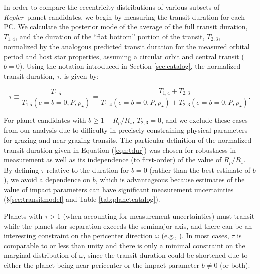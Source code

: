 \documentclass{aastex62}
\newcommand{\ik}{{\it Kepler~}}
\begin{document}
In order to compare the eccentricity distributions of various subsets of \ik planet candidates, we begin by measuring the transit duration for each PC. 
We calculate the posterior mode of the average of the full transit duration, {$T_{1,4}$}, and the duration of the ``flat bottom'' portion of the transit, {$T_{2,3}$},  normalized by the analogous predicted transit duration for the measured orbital period and host star properties, assuming a circular orbit and central transit ($b=0$). Using the notation introduced in Section \ref{sec:catalog}, the normalized transit duration, $\tau$, is given by:

\begin{equation}
    \tau \equiv \frac{T_{1.5}}{T_{1.5}(e = b = 0,P,\rho_\star)} = \frac{T_{1,4} + T_{2,3}}{{ T}_{1,4}(e = b = 0,P,\rho_\star) + {T}_{2,3}(e = b = 0,P,\rho_\star)}  .
    \label{eqn:tdur}
\end{equation}  

\noindent For planet candidates with {$b \ge 1-R_p/R_\star$, $T_{2,3}=0$}, and we exclude these cases from our analysis due to difficulty in precisely constraining physical parameters for grazing and near-grazing transits. The particular definition of the normalized transit duration given in Equation (\ref{eqn:tdur}) was chosen for robustness in measurement as well as its independence (to first-order) of the value of $R_p/R_\star$.  {By defining $\tau$ relative to the duration for $b=0$ (rather than the best estimate of $b$), we avoid a dependence on $b$, which is advantageous because estimates of the value of impact parameters can have significant measurement uncertainties (\S\ref{sec:transitmodel} and Table \ref{tab:planetcatalog}).}

Planets with $\tau > 1$  (when accounting for measurement uncertainties) must transit while the planet-star separation exceeds the semimajor axis, and there can be an interesting constraint on the pericenter direction $\omega$ (e.g., \citealt{DawsonJohnson:2012}).  
In most cases, $\tau$ is comparable to or less than unity and there is only a minimal constraint on the marginal distribution of $\omega$, since the transit duration could be shortened due to either the planet being near pericenter or the impact parameter $b \neq 0$ (or both).  
\end{document}
